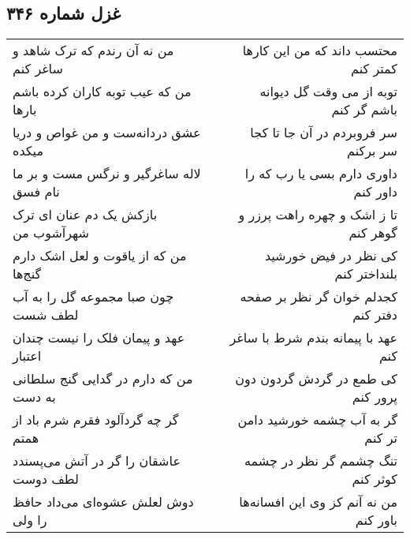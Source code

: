 \begin{center}
\section*{غزل شماره ۳۴۶}
\label{sec:sh346}
\begin{longtable}{l p{0.5cm} r}
من نه آن رندم که ترک شاهد و ساغر کنم
&&
محتسب داند که من این کارها کمتر کنم
\\
من که عیب توبه کاران کرده باشم بارها
&&
توبه از می وقت گل دیوانه باشم گر کنم
\\
عشق دردانه‌ست و من غواص و دریا میکده
&&
سر فروبردم در آن جا تا کجا سر برکنم
\\
لاله ساغرگیر و نرگس مست و بر ما نام فسق
&&
داوری دارم بسی یا رب که را داور کنم
\\
بازکش یک دم عنان ای ترک شهرآشوب من
&&
تا ز اشک و چهره راهت پرزر و گوهر کنم
\\
من که از یاقوت و لعل اشک دارم گنج‌ها
&&
کی نظر در فیض خورشید بلنداختر کنم
\\
چون صبا مجموعه گل را به آب لطف شست
&&
کجدلم خوان گر نظر بر صفحه دفتر کنم
\\
عهد و پیمان فلک را نیست چندان اعتبار
&&
عهد با پیمانه بندم شرط با ساغر کنم
\\
من که دارم در گدایی گنج سلطانی به دست
&&
کی طمع در گردش گردون دون پرور کنم
\\
گر چه گردآلود فقرم شرم باد از همتم
&&
گر به آب چشمه خورشید دامن تر کنم
\\
عاشقان را گر در آتش می‌پسندد لطف دوست
&&
تنگ چشمم گر نظر در چشمه کوثر کنم
\\
دوش لعلش عشوه‌ای می‌داد حافظ را ولی
&&
من نه آنم کز وی این افسانه‌ها باور کنم
\\
\end{longtable}
\end{center}

